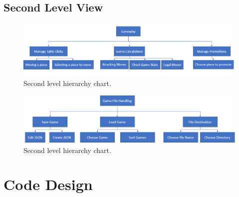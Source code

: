 \subsection{Second Level View}
\begin{figure}[H]
\centering
	\includegraphics[width=1.0\textwidth]{images/design-charts/gameplay_level}
	\caption{Second level hierarchy chart.}
\end{figure}
\begin{figure}[H]
\centering
	\includegraphics[width=1.0\textwidth]{images/design-charts/filehandling_level}
	\caption{Second level hierarchy chart.}
\end{figure}
\section{Code Design}
